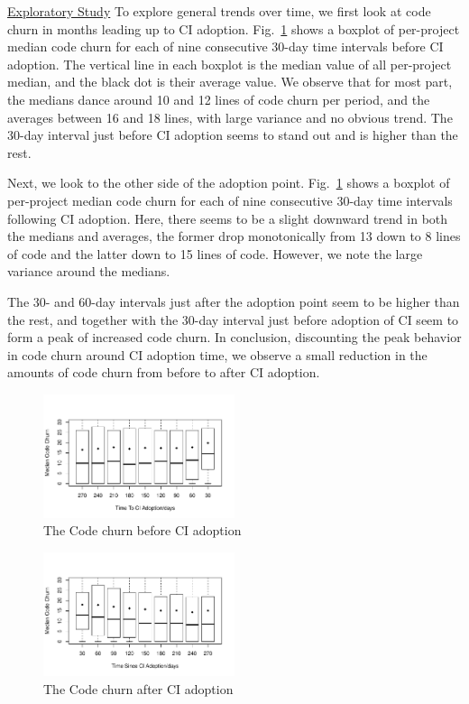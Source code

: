 \noindent \underline{Exploratory Study} To explore general trends over time, we first look at code churn in months leading up to CI adoption.
Fig.~\ref{Fig:CodeChurnBefore} shows a boxplot of per-project median code churn for each of nine consecutive 30-day time intervals before CI adoption.
The vertical line in each boxplot is the median value of all per-project median, and the black dot is their average value.
We observe that for most part, the medians dance around 
10 and 12 lines of code churn per period, and the averages between 16 and 18 lines, with large variance and no obvious trend. The 30-day interval just before CI adoption seems to stand out and is higher than the rest.

Next, we look to the other side of the adoption point. Fig.~\ref{Fig:CodeChurnBefore} shows a boxplot of per-project median code churn for each of nine consecutive 30-day time intervals following CI adoption.
Here,  there seems to be a slight downward trend in both the medians and averages, the former drop monotonically from 13 down to 8 lines of code and the latter down to 15 lines of code.
However, we note the large variance around the medians.

The 30- and 60-day intervals just after the adoption point seem to be higher than the rest, and together with the 30-day interval just before adoption of CI seem to form a peak of increased code churn.
In conclusion, discounting the peak behavior in code churn around CI adoption time, we observe a small reduction in the amounts of code churn from before to after CI adoption.


\begin{figure}[!t]
\centering
\includegraphics[width=0.5\textwidth]{churn_before.pdf}
\caption{The Code churn before CI adoption}
\label{Fig:CodeChurnBefore}
\end{figure}


\begin{figure}[!t]
\centering
\includegraphics[width=0.5\textwidth]{churn_after.pdf}
\caption{The Code churn after CI adoption}
\label{Fig:CodeChurnAfter}
\end{figure}

